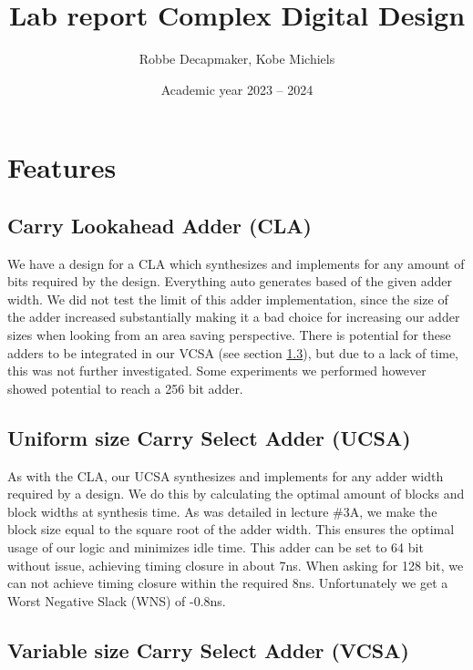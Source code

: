 \documentclass[a4paper,kul]{kulakarticle} %
\date{Academic year 2023 -- 2024}
\title{Lab report Complex Digital Design}
\author{Robbe Decapmaker, Kobe Michiels}
\begin{document}
\maketitle
\section{Features}


\subsection{Carry Lookahead Adder (CLA)}

We have a design for a CLA which synthesizes and implements for any amount of bits required by the design. Everything auto generates based of the given adder width. We did not test the limit of this adder implementation, since the size of the adder increased substantially making it a bad choice for increasing our adder sizes when looking from an area saving perspective. There is potential for these adders to be integrated in our VCSA (see section \ref{sec:VCSA}), but due to a lack of time, this was not further investigated. Some experiments we performed however showed potential to reach a 256 bit adder. 

\subsection{Uniform size Carry Select Adder (UCSA)}

As with the CLA, our UCSA synthesizes and implements for any adder width required by a design. We do this by calculating the optimal amount of blocks and block widths at synthesis time. As was detailed in lecture \#3A, we make the block size equal to the square root of the adder width. This ensures the optimal usage of our logic and minimizes idle time. This adder can be set to 64 bit without issue, achieving timing closure in about 7ns. When asking for 128 bit, we can not achieve timing closure within the required 8ns. Unfortunately we get a Worst Negative Slack (WNS) of -0.8ns. 

\subsection{Variable size Carry Select Adder (VCSA)}
\label{sec:VCSA}
\end{document}
